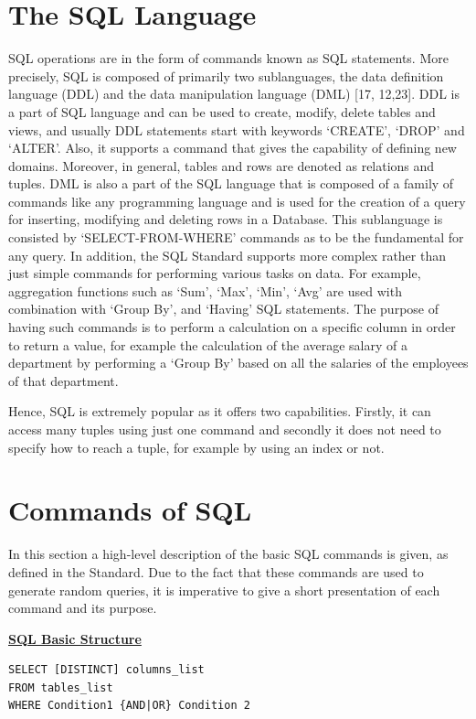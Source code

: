 \section{The SQL Language}
SQL operations are in the form of commands known as SQL statements. More precisely, SQL is composed of primarily two sublanguages, the data definition language (DDL) and the data manipulation language (DML) [17, 12,23]. DDL is a part of SQL language and can be used to create, modify, delete tables and views, and usually DDL statements start with keywords ‘CREATE’, ‘DROP’ and ‘ALTER’. Also, it supports a command that gives the capability of defining new domains. Moreover, in general, tables and rows are denoted as relations and tuples. DML is also a part of the SQL language that is composed of a family of commands like any programming language and is used for the creation of a query for inserting, modifying and deleting rows in a Database. This sublanguage is consisted by ‘SELECT-FROM-WHERE’ commands as to be the fundamental for any query. In addition, the SQL Standard supports more complex rather than just simple commands for performing various tasks on data. For example, aggregation functions such as ‘Sum’, ‘Max’, ‘Min’, ‘Avg’ are used with combination with ‘Group By’, and ‘Having’ SQL statements. The purpose of having such commands is to perform a calculation on a specific column in order to return a value, for example the calculation of the average salary of a department by performing a ‘Group By’ based on all the salaries of the employees of that department. 

Hence, SQL is extremely popular as it offers two capabilities. Firstly, it can access many tuples using just one command and secondly it does not need to specify how to reach a tuple, for example by using an index or not. 


\section{Commands of SQL}
In this section a high-level description of the basic SQL commands is given, as defined in the Standard. Due to the fact that these commands are used to generate random queries, it is imperative to give a short presentation of each command and its purpose. 

\hfill\newline
\noindent\textbf{\underline{SQL Basic Structure}} 
\begin{mdframed}[nobreak=true, backgroundcolor=lightgray!20] 
\begin{lstlisting}[style=SQL]
SELECT [DISTINCT] columns_list
FROM tables_list
WHERE Condition1 {AND|OR} Condition 2
\end{lstlisting}
\end{mdframed}
 
